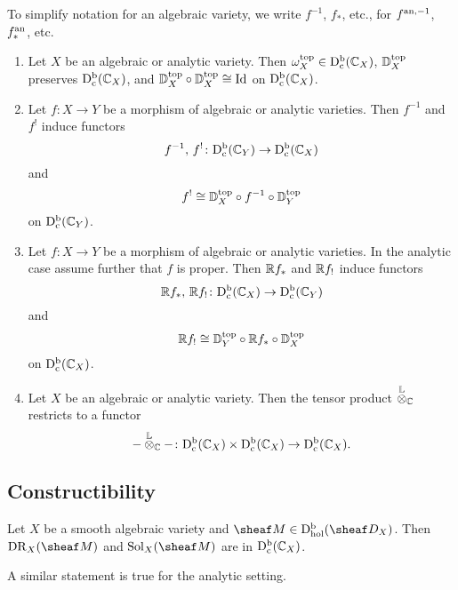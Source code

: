 \documentclass[number-in-sections,a4paper]{notes}
\begin{document}
To simplify notation for an algebraic variety, we write $f^{-1}$, $f_*$, etc., for $f^{{\mathrm{an}},-1}$, $f^{\mathrm{an}}_*$, etc.

\begin{Theorem}\leavevmode
    \begin{enumerate}
        \item Let $X$ be an algebraic or analytic variety.
            Then $\omega^{\mathrm{top}}_X \in \mathrm{D}^{\mathrm{b}}_{\mathrm{c}}({\mathbb{C}}_{X})$, $\mathbb{D}^{\mathrm{top}}_X$ preserves $\mathrm{D}^{\mathrm{b}}_{\mathrm{c}}({\mathbb{C}}_{X})$, and $\mathbb{D}^{\mathrm{top}}_X \circ \mathbb{D}^{\mathrm{top}}_X \cong {\mathrm{Id}_{}}$ on $\mathrm{D}^{\mathrm{b}}_{\mathrm{c}}({\mathbb{C}}_{X})$.
        \item Let $f\colon X \to Y$ be a morphism of algebraic or analytic varieties.
            Then $f^{-1}$ and $f^!$ induce functors
            \[
                f^{-1},\, f^!\colon \mathrm{D}^{\mathrm{b}}_{\mathrm{c}}({\mathbb{C}}_{Y}) \to \mathrm{D}^{\mathrm{b}}_{\mathrm{c}}({\mathbb{C}}_{X})
            \]
            and
            \[
                f^! \cong \mathbb{D}^{\mathrm{top}}_X \circ f^{-1} \circ \mathbb{D}^{\mathrm{top}}_Y
            \]
            on $\mathrm{D}^{\mathrm{b}}_{\mathrm{c}}({\mathbb{C}}_{Y})$.
        \item Let $f\colon X \to Y$ be a morphism of algebraic or analytic varieties.
            In the analytic case assume further that $f$ is proper.
            Then ${\mathbb{R}} f_*$ and ${\mathbb{R}} f_!$ induce functors
            \[
                {\mathbb{R}} f_*,\, {\mathbb{R}} f_!\colon \mathrm{D}^{\mathrm{b}}_{\mathrm{c}}({\mathbb{C}}_{X}) \to \mathrm{D}^{\mathrm{b}}_{\mathrm{c}}({\mathbb{C}}_{Y})
            \]
            and
            \[
                {\mathbb{R}} f_! \cong \mathbb{D}^{\mathrm{top}}_Y \circ {\mathbb{R}} f_* \circ \mathbb{D}^{\mathrm{top}}_X
            \]
            on $\mathrm{D}^{\mathrm{b}}_{\mathrm{c}}({\mathbb{C}}_{X})$.
        \item Let $X$ be an algebraic or analytic variety.
            Then the tensor product $\mathbin{\overset{{\mathbb{L}}}{\otimes}}_{{\mathbb{C}}}$ restricts to a functor
            \[
                - \mathbin{\overset{{\mathbb{L}}}{\otimes}}_{\mathbb{C}} -\colon \mathrm{D}^{\mathrm{b}}_{\mathrm{c}}({\mathbb{C}}_{X}) \times \mathrm{D}^{\mathrm{b}}_{\mathrm{c}}({\mathbb{C}}_{X}) \to \mathrm{D}^{\mathrm{b}}_{\mathrm{c}}({\mathbb{C}}_{X}).
            \]
    \end{enumerate}
\end{Theorem}


\subsection{Constructibility}

\begin{Theorem}\label{thm:constructibility}
    Let $X$ be a smooth algebraic variety and $\sheaf M \in \catDbDModhol{X}$.
    Then $\DR_X(\sheaf M)$ and $\Sol_X(\sheaf M)$ are in $\mathrm{D}^{\mathrm{b}}_{\mathrm{c}}({\mathbb{C}}_{X})$.
\end{Theorem}

\begin{Remark}
    A similar statement is true for the analytic setting.
\end{Remark}
\end{document}
